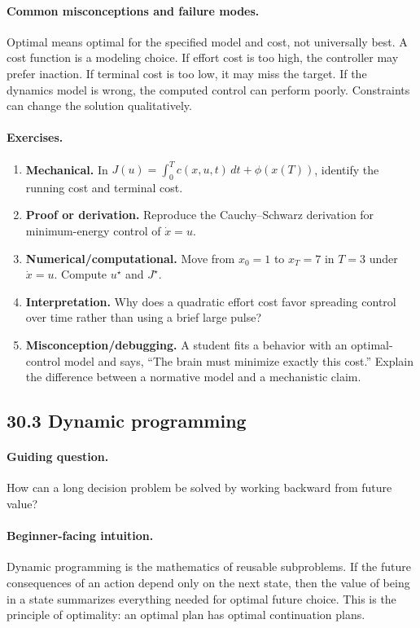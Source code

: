 \paragraph{Common misconceptions and failure modes.}
Optimal means optimal for the specified model and cost, not universally best. A cost function is a modeling choice. If effort cost is too high, the controller may prefer inaction. If terminal cost is too low, it may miss the target. If the dynamics model is wrong, the computed control can perform poorly. Constraints can change the solution qualitatively.

\paragraph{Exercises.}
\begin{enumerate}[label=\textbf{30.2.\arabic*.}, leftmargin=*]
\item \textbf{Mechanical.} In \(J(u)=\int_0^T c(x,u,t)\,dt+\phi(x(T))\), identify the running cost and terminal cost.
\item \textbf{Proof or derivation.} Reproduce the Cauchy--Schwarz derivation for minimum-energy control of \(\dot x=u\).
\item \textbf{Numerical/computational.} Move from \(x_0=1\) to \(x_T=7\) in \(T=3\) under \(\dot x=u\). Compute \(u^\star\) and \(J^\star\).
\item \textbf{Interpretation.} Why does a quadratic effort cost favor spreading control over time rather than using a brief large pulse?
\item \textbf{Misconception/debugging.} A student fits a behavior with an optimal-control model and says, ``The brain must minimize exactly this cost.'' Explain the difference between a normative model and a mechanistic claim.
\end{enumerate}

\subsection{30.3 Dynamic programming}

\paragraph{Guiding question.}
How can a long decision problem be solved by working backward from future value?

\paragraph{Beginner-facing intuition.}
Dynamic programming is the mathematics of reusable subproblems. If the future consequences of an action depend only on the next state, then the value of being in a state summarizes everything needed for optimal future choice. This is the principle of optimality: an optimal plan has optimal continuation plans.

